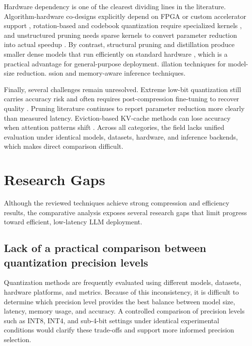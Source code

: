 Hardware dependency is one of the clearest dividing lines in the literature. Algorithm-hardware co-designs explicitly depend on FPGA or custom accelerator support \cite{xu2026daypq,cho2025sub4bit,wang2025ofqllm}, rotation-based and codebook quantization require specialized kernels \cite{ashkboos2024quarot,tseng2024qtip}, and unstructured pruning needs sparse kernels to convert parameter reduction into actual speedup \cite{frantar2023sparsegpt,sun2024wanda}. By contrast, structural pruning and distillation produce smaller dense models that run efficiently on standard hardware \cite{ashkboos2024slicegpt,sanh2020distilbert,men2024shortgpt}, which is a practical advantage for general-purpose deployment. illation techniques for model-size reduction. ssion and memory-aware inference techniques.

Finally, several challenges remain unresolved. Extreme low-bit quantization still carries accuracy risk and often requires post-compression fine-tuning to recover quality \cite{chen2025efficientqat,malinovskii2024pvtuning}. Pruning literature continues to report parameter reduction more clearly than measured latency. Eviction-based KV-cache methods can lose accuracy when attention patterns shift \cite{zhang2023h2o,li2024snapkv}. Across all categories, the field lacks unified evaluation under identical models, datasets, hardware, and inference backends, which makes direct comparison difficult.

\section{Research Gaps}
\label{sec:lr-gaps}

Although the reviewed techniques achieve strong compression and efficiency results, the comparative analysis exposes several research gaps that limit progress toward efficient, low-latency LLM deployment.

\subsection{Lack of a practical comparison between quantization precision levels}

Quantization methods are frequently evaluated using different models, datasets, hardware platforms, and metrics. Because of this inconsistency, it is difficult to determine which precision level provides the best balance between model size, latency, memory usage, and accuracy. A controlled comparison of precision levels such as INT8, INT4, and sub-4-bit settings \cite{dettmers2022llmint8,frantar2023gptq,huang2024billm} under identical experimental conditions would clarify these trade-offs and support more informed precision selection.

